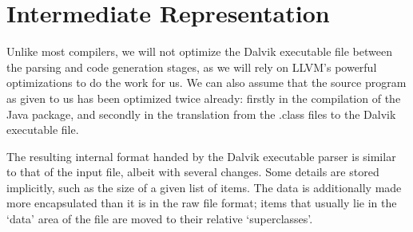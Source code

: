 \section{Intermediate Representation}
\label{sec:irep}

Unlike most compilers, we will not optimize the Dalvik executable file between the parsing and code generation stages, as we will rely on LLVM's powerful optimizations to do the work for us. We can also assume that the source program as given to us has been optimized twice already: firstly in the compilation of the Java package, and secondly in the translation from the .class files to the Dalvik executable file.

The resulting internal format handed by the Dalvik executable parser is similar to that of the input file, albeit with several changes. Some details are stored implicitly, such as the size of a given list of items. The data is additionally made more encapsulated than it is in the raw file format; items that usually lie in the `data' area of the file are moved to their relative `superclasses'.
